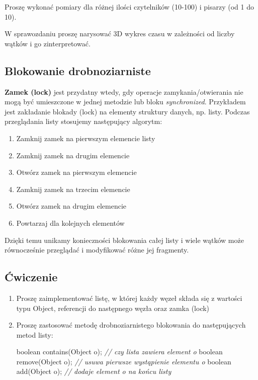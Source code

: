 \documentclass[11pt]{article}
\providecommand{\tightlist}{%
      \setlength{\itemsep}{0pt}\setlength{\parskip}{0pt}}
\newenvironment{Shaded}{}{}
\newcommand{\DataTypeTok}[1]{\textcolor[rgb]{0.56,0.13,0.00}{{#1}}}
\newcommand{\CommentTok}[1]{\textcolor[rgb]{0.38,0.63,0.69}{\textit{{#1}}}}
\newcommand{\FunctionTok}[1]{\textcolor[rgb]{0.02,0.16,0.49}{{#1}}}
\newcommand{\NormalTok}[1]{{#1}}
\newcommand{\OperatorTok}[1]{\textcolor[rgb]{0.40,0.40,0.40}{{#1}}}
\newcommand{\BuiltInTok}[1]{{#1}}
\begin{document}
Proszę wykonać pomiary dla różnej ilości czytelników (10-100) i pisarzy
(od 1 do 10).

W sprawozdaniu proszę narysować 3D wykres czasu w zależności od liczby
wątków i go zinterpretować.

\hypertarget{blokowanie-drobnoziarniste}{%
\subsection{Blokowanie
drobnoziarniste}\label{blokowanie-drobnoziarniste}}

\textbf{Zamek (lock)} jest przydatny wtedy, gdy operacje
zamykania/otwierania nie mogą być umieszczone w jednej metodzie lub
bloku \emph{synchronized}. Przykładem jest zakładanie blokady (lock) na
elementy struktury danych, np. listy. Podczas przeglądania listy
stosujemy następujący algorytm:

\begin{enumerate}
\def\labelenumi{\arabic{enumi}.}
\tightlist
\item
  Zamknij zamek na pierwszym elemencie listy
\item
  Zamknij zamek na drugim elemencie
\item
  Otwórz zamek na pierwszym elemencie
\item
  Zamknij zamek na trzecim elemencie
\item
  Otwórz zamek na drugim elemencie
\item
  Powtarzaj dla kolejnych elementów
\end{enumerate}

Dzięki temu unikamy konieczności blokowania całej listy i wiele wątków
może równocześnie przeglądać i modyfikować różne jej fragmenty.

\hypertarget{ux107wiczenie}{%
\subsection{Ćwiczenie}\label{ux107wiczenie}}

\begin{enumerate}
\def\labelenumi{\arabic{enumi}.}
\item
  Proszę zaimplementować listę, w której każdy węzeł składa się z
  wartości typu Object, referencji do następnego węzła oraz zamka (lock)
\item
  Proszę zastosować metodę drobnoziarnistego blokowania do następujących
  metod listy:

\begin{Shaded}
\begin{Highlighting}[]
\DataTypeTok{boolean} \FunctionTok{contains}\OperatorTok{(}\BuiltInTok{Object}\NormalTok{ o}\OperatorTok{);} \CommentTok{// czy lista zawiera element o}
\DataTypeTok{boolean} \FunctionTok{remove}\OperatorTok{(}\BuiltInTok{Object}\NormalTok{ o}\OperatorTok{);} \CommentTok{// usuwa pierwsze wystąpienie elementu o}
\DataTypeTok{boolean} \FunctionTok{add}\OperatorTok{(}\BuiltInTok{Object}\NormalTok{ o}\OperatorTok{);} \CommentTok{// dodaje element o na końcu listy  }
\end{Highlighting}
\end{Shaded}
\end{enumerate}
\end{document}

